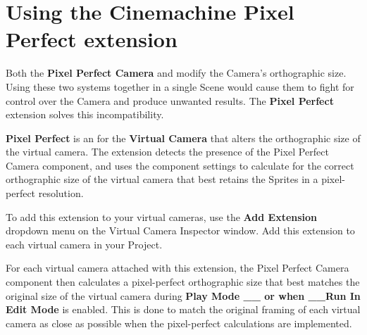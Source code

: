 \chapter{Using the Cinemachine Pixel Perfect extension}
\hypertarget{md__hey_tea_9_2_library_2_package_cache_2com_8unity_8cinemachine_0d2_89_87_2_documentation_0i_2_cinemachine_pixel_perfect}{}\label{md__hey_tea_9_2_library_2_package_cache_2com_8unity_8cinemachine_0d2_89_87_2_documentation_0i_2_cinemachine_pixel_perfect}
\label{md__hey_tea_9_2_library_2_package_cache_2com_8unity_8cinemachine_0d2_89_87_2_documentation_0i_2_cinemachine_pixel_perfect_autotoc_md710}%
%
 Both the {\bfseries{Pixel Perfect Camera}} and  modify the Camera’s orthographic size. Using these two systems together in a single Scene would cause them to fight for control over the Camera and produce unwanted results. The {\bfseries{ Pixel Perfect}} extension solves this incompatibility.

{\bfseries{ Pixel Perfect}} is an  for the {\bfseries{ Virtual Camera}} that alters the orthographic size of the virtual camera. The extension detects the presence of the Pixel Perfect Camera component, and uses the component settings to calculate for the correct orthographic size of the virtual camera that best retains the Sprites in a pixel-\/perfect resolution.

To add this extension to your virtual cameras, use the {\bfseries{Add Extension}} dropdown menu on the  Virtual Camera Inspector window. Add this extension to each virtual camera in your Project.



For each virtual camera attached with this extension, the Pixel Perfect Camera component then calculates a pixel-\/perfect orthographic size that best matches the original size of the virtual camera during {\bfseries{Play Mode \+\_\+\+\_\+ or when \+\_\+\+\_\+\+Run In Edit Mode}} is enabled. This is done to match the original framing of each virtual camera as close as possible when the pixel-\/perfect calculations are implemented.


